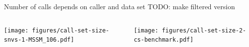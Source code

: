\documentclass{beamer}
\begin{document}
\begin{frame}{Number of calls depends on caller and data set}
TODO: make filtered version

\begin{columns}[t]
\begin{column}{0.4\textwidth}

\texttt{[image: figures/call-set-size-snvs-1-MSSM\_106.pdf]}
\end{column}

\begin{column}{0.6\textwidth}

\texttt{[image: figures/call-set-size-2-cs-benchmark.pdf]}
\end{column}
\end{columns}
\end{frame}
\end{document}
